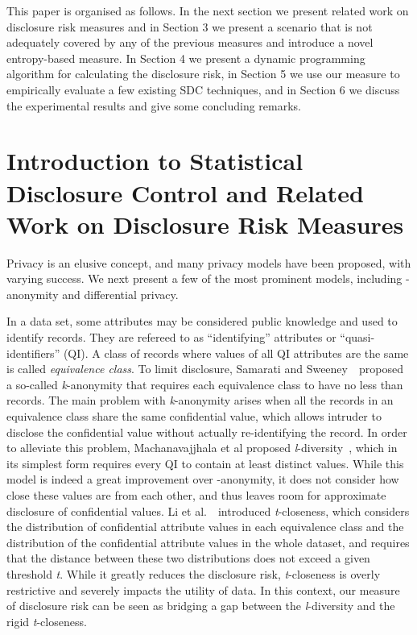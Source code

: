 \documentclass{llncs}
\begin{document}
This paper is organised as follows. In the next section we present
related work on disclosure risk measures and in Section 3 we
present a scenario that is not adequately covered by any of the
previous measures and  introduce a novel entropy-based
measure. In Section 4 we present a dynamic programming
algorithm for calculating the disclosure risk, in Section 5 we use
our measure to empirically evaluate a few existing SDC techniques, and in Section 6 we discuss
the experimental results and give some concluding remarks.

\section{Introduction to Statistical Disclosure Control and Related Work on Disclosure Risk Measures}

Privacy is an elusive concept, and many privacy models have been proposed,
with varying success. We next present a few of the most prominent models, including -anonymity and differential privacy.

In a data set, some attributes may be considered public knowledge
and used to identify records. They are refereed to as
``identifying'' attributes or ``quasi-identifiers'' (QI).
A class of records where values of all QI attributes are the same is called
\emph{equivalence class}. To limit disclosure, Samarati and
Sweeney~\cite{Samarati:k-anonymity98}~proposed a so-called
\emph{k}-anonymity that requires each equivalence class to have no
less than  records. The main problem with \emph{k}-anonymity arises
when all the records in an equivalence class share the same
confidential value, which allows intruder to disclose the
confidential value without actually re-identifying the record.
In order to alleviate this problem, Machanavajjhala et al proposed
 \emph{l}-diversity~\cite{MKGV07}, which in its simplest form  requires every QI to contain at
 least  distinct values. While this model is indeed a great improvement over -anonymity, it does not  consider how close these values are from each other,
 and thus leaves room for approximate disclosure of confidential values.
Li et al.~\cite{Ninghui:t-Closeness07}~introduced
\emph{t}-closeness, which considers the  distribution of
confidential attribute values in each equivalence class and the distribution of the confidential attribute values in
the whole dataset, and requires that the distance between these two distributions
does not exceed a given threshold \emph{t}. While it greatly reduces the disclosure risk, \emph{t}-closeness is overly restrictive and severely impacts the utility of data. In this context, our measure of disclosure risk can be seen as bridging a gap between the \emph{l}-diversity and the rigid \emph{t}-closeness.
\end{document}
